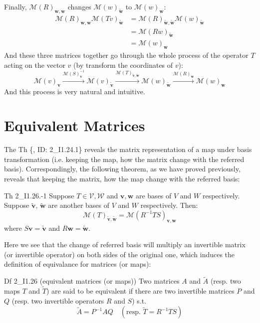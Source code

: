 \documentclass{article}
\newcommand{\basisTilde}[1]{\tilde{\pmb{#1}}}
\begin{document}
Finally, $\mathcal{M}(R)_{\pmb{w}, \pmb{w}}$ changes $\mathcal{M}(w)_{\basisTilde{w}}$ to $\mathcal{M}(w)_{\pmb{w}}$:
$$
\begin{aligned}
    \mathcal{M}(R)_{\pmb{w}, \pmb{w}}\mathcal{M}(Tv)_{\basisTilde{w}} &= \mathcal{M}(R)_{\basisTilde{w}, \basisTilde{w}}\mathcal{M}(w)_{\basisTilde{w}} \\
    &= \mathcal{M}(Rw)_{\basisTilde{w}} \\
    &= \mathcal{M}(w)_{\pmb{w}}
\end{aligned}
$$
And these three matrices together go through the whole process of the operator $T$ acting on the vector $v$ (by transform the coordinates of $v$):
$$\mathcal{M}(v)_{\pmb{v}}\overset{\mathcal{M}(S)^{-1}_{\pmb{v}}}{\longrightarrow}\mathcal{M}(v)_{\basisTilde{v}}\overset{\mathcal{M}(T)_{\basisTilde{v}, \basisTilde{w}}}{\longrightarrow}\mathcal{M}(w)_{\basisTilde{w}}\overset{\mathcal{M}(R)_{\pmb{w}}}{\longrightarrow}\mathcal{M}(w)_{\pmb{w}}$$
And this process is very natural and intuitive.

\section{Equivalent Matrices}
The Th \{, ID: 2\_I1.24.1\} reveals the matrix representation of a map under basis transformation (i.e. keeping the map, how the matrix change with the referred basis). Correspondingly, the following theorem, as we have proved previously, reveals that keeping the matrix, how the map change with the referred basis:
\begin{Th}{Th 2\_I1.26.-1}
    Suppose $T\in\mathcal{V, W}$ and $\pmb{v}, \pmb{w}$ are bases of $V$ and $W$ respectively. Suppose $\basisTilde{v}$, $\basisTilde{w}$ are another bases of $V$ and $W$ respectively. Then:
    $$\mathcal{M}(T)_{\basisTilde{v}, \basisTilde{w}} = \mathcal{M}(R^{-1}TS)_{\pmb{v}, \pmb{w}}$$
    where $S\pmb{v} = \basisTilde{v}$ and $R\pmb{w} = \basisTilde{w}$.
\end{Th}

Here we see that the change of referred basis will multiply an invertible matrix (or invertible operator) on both sides of the original one, which induces the definition of equivalance for matrices (or maps):
\begin{Df}{Df 2\_I1.26 (equivalent matrices (or maps))}
    Two matrices $A$ and $\tilde{A}$ (resp. two maps $T$ and $\tilde{T}$) are said to be equivalent if there are two invertible matrices $P$ and $Q$ (resp. two invertible operators $R$ and $S$) s.t.
    $$ \tilde{A} = P^{-1}AQ \quad(\text{resp. } \tilde{T} = R^{-1}TS) $$
\end{Df}
\end{document}
